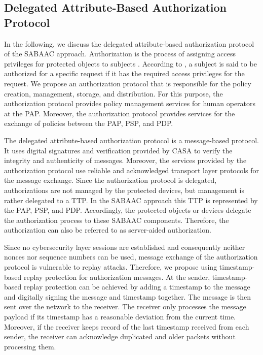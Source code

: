 \subsection{Delegated Attribute-Based Authorization Protocol}
\label{sec:approach:sabaac:authorization}
In the following, we discuss the delegated attribute-based authorization protocol of the SABAAC approach.
Authorization is the process of assigning access privileges for protected objects to subjects \cite{Eckert2023}.
According to \citeauthor{Eckert2023} \cite{Eckert2023}, a subject is said to be authorized for a specific request if it has the required access privileges for the request.
We propose an authorization protocol that is responsible for the policy creation, management, storage, and distribution.
For this purpose, the authorization protocol provides policy management services for human operators at the PAP.
Moreover, the authorization protocol provides services for the exchange of policies between the PAP, PSP, and PDP.

The delegated attribute-based authorization protocol is a message-based protocol.
It uses digital signatures and verification provided by CASA to verify the integrity and authenticity of messages.
Moreover, the services provided by the authorization protocol use reliable and acknowledged transport layer protocols for the message exchange.
Since the authorization protocol is delegated, authorizations are not managed by the protected devices, but management is rather delegated to a TTP.
In the SABAAC approach this TTP is represented by the PAP, PSP, and PDP.
Accordingly, the protected objects or devices delegate the authorization process to these SABAAC components.
Therefore, the authorization can also be referred to as server-aided authorization.

Since no cybersecurity layer sessions are established and consequently neither nonces nor sequence numbers can be used, message exchange of the authorization protocol is vulnerable to replay attacks.
Therefore, we propose using timestamp-based replay protection for authorization messages.
At the sender, timestamp-based replay protection can be achieved by adding a timestamp to the message and digitally signing the message and timestamp together.
The message is then sent over the network to the receiver.
The receiver only processes the message payload if its timestamp has a reasonable deviation from the current time.
Moreover, if the receiver keeps record of the last timestamp received from each sender, the receiver can acknowledge duplicated and older packets without processing them.

